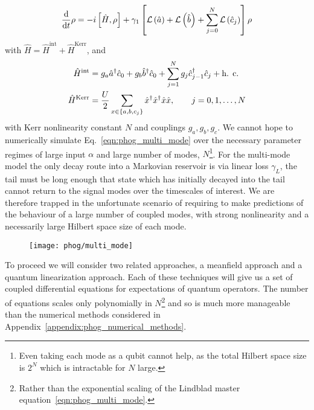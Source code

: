 \begin{equation}\label{eqn:phog_multi_mode}
\frac{\mathrm{d}}{\mathrm{d}t} \rho = - i \left[\hat{H}, \rho\right] + \gamma_1 \left[\mathcal{L}\left(\hat{a}\right) + \mathcal{L}\left(\hat{b}\right) + \sum_{j=0}^N \mathcal{L}\left(\hat{c}_j\right) \right] \rho
\end{equation}
with $\hat{H} = \hat{H}^{\text{int}} + \hat{H}^{\text{Kerr}}$, and
\begin{align}
\hat{H}^{\text{int}} &= g_a \hat{a}^\dagger \hat{c}_0 + g_b \hat{b}^\dagger \hat{c}_0 + \sum_{j=1}^N g_j \hat{c}_{j-1}^\dagger \hat{c}_j + \hc \notag \\
%
\hat{H}^{\text{Kerr}} &= \frac{U}{2} \sum_{x \in \left\{a, b, c_j\right\}} \hat{x}^\dagger \hat{x}^\dagger \hat{x} \hat{x}, \qq{} j = 0, 1, \dots, N
\end{align}
with Kerr nonlinearity constant $N$ and couplings $g_a, g_b, g_c$. We cannot hope to numerically simulate Eq.~\ref{eqn:phog_multi_mode} over the necessary parameter regimes of large input $\alpha$ and large number of modes, $N$\footnote{Even taking each mode as a qubit cannot help, as the total Hilbert space size is $2^{N}$ which is intractable for $N$ large.}. For the multi-mode model the only decay route into a Markovian reservoir is via linear loss $\gamma_L$, the tail must be long enough that state which has initially decayed into the tail cannot return to the signal modes over the timescales of interest. We are therefore trapped in the unfortunate scenario of requiring to make predictions of the behaviour of a large number of coupled modes, with strong nonlinearity and a necessarily large Hilbert space size of each mode. 

\begin{figure}[htp]
\centering
\texttt{[image: phog/multi\_mode]}
\caption{\label{fig:phog_multi_mode} }
\end{figure}

To proceed we will consider two related approaches, a meanfield approach and a quantum linearization approach. Each of these techniques will give us a set of coupled differential equations for expectations of quantum operators. The number of equations scales only polynomially in $N$\footnote{Rather than the exponential scaling of the Lindblad master equation~\ref{eqn:phog_multi_mode}.} and so is much more manageable than the numerical methods considered in Appendix~\ref{appendix:phog_numerical_methods}.

